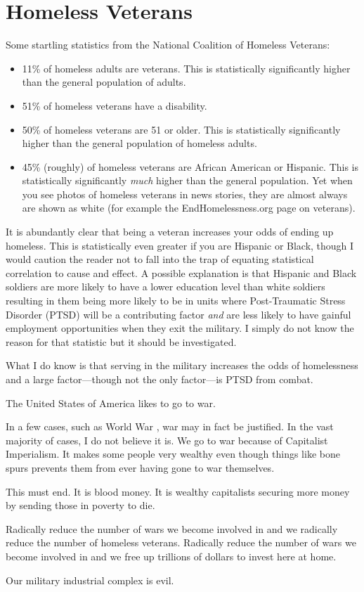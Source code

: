 \section{Homeless Veterans}

Some startling statistics from the National Coalition of Homeless Veterans:

\begin{itemize}
  \item 11\% of homeless adults are veterans. This is statistically significantly higher than the general population of adults.
  \item 51\% of homeless veterans have a disability.
  \item 50\% of homeless veterans are 51 or older. This is statistically significantly higher than the general population of homeless adults.
  \item 45\% (roughly) of homeless veterans are African American or Hispanic. This is statistically significantly \emph{much} higher than the general population. Yet when you see photos of homeless veterans in news stories, they are almost always are shown as white (for example the EndHomelessness.org page on veterans).
\end{itemize}

It is abundantly clear that being a veteran increases your odds of ending up homeless. This is statistically even greater if you are Hispanic or Black, though I would caution the reader not to fall into the trap of equating statistical correlation to cause and effect. A possible explanation is that Hispanic and Black soldiers are more likely to have a lower education level than white soldiers resulting in them being more likely to be in units where Post-Traumatic Stress Disorder (PTSD) will be a contributing factor \emph{and} are less likely to have gainful employment opportunities when they exit the military. I simply do not know the reason for that statistic but it should be investigated.

What I do know is that serving in the military increases the odds of homelessness and a large factor---though not the only factor---is PTSD from combat.

The United States of America likes to go to war.

In a few cases, such as World War , war may in fact be justified. In the vast majority of cases, I do not believe it is. We go to war because of Capitalist Imperialism. It makes some people very wealthy even though things like bone spurs prevents them from ever having gone to war themselves.

This must end. It is blood money. It is wealthy capitalists securing more money by sending those in poverty to die.

Radically reduce the number of wars we become involved in and we radically reduce the number of homeless veterans. Radically reduce the number of wars we become involved in and we free up trillions of dollars to invest here at home.

Our military industrial complex is evil.

